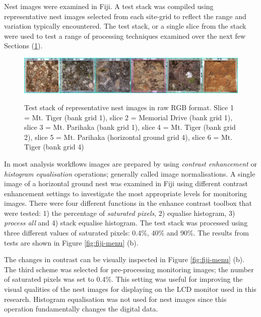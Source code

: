 Nest images were examined in Fiji. A test stack was compiled using representative nest images selected from each site-grid to reflect the range and variation typically encountered. The test stack, or a single slice from the stack were used to test a range of processing techniques examined over the next few Sections (\ref{fig:rep-nest-stack}).

\begin{figure}[!htbp]\myfloatalign
\includegraphics[width=1\linewidth]{gfx6/segtest/1rf}\\
\caption[Test stack of representative nest images]{Test stack of representative nest images in raw \ac{RGB} format. Slice 1 = Mt. Tiger (bank grid 1), slice 2 = Memorial Drive (bank grid 1), slice 3 = Mt. Parihaka (bank grid 1), slice 4 = Mt. Tiger (bank grid 2), slice 5 = Mt. Parihaka (horizontal ground grid 4), slice 6 = Mt. Tiger (bank grid 4)} \label{fig:rep-nest-stack}
\end{figure}

In most analysis workflows images are prepared by using \emph{contrast enhancement} or \emph{histogram equalisation} operations; generally called image normalisations. A single image of a horizontal ground nest was examined in \ac{Fiji} using different contrast enhancement settings to investigate the most appropriate levels for monitoring images. There were four different functions in the enhance contrast toolbox that were tested: 1) the percentage of \emph{saturated pixels}, 2) equalise histogram, 3) \emph{process all} and 4) stack equalise histogram. The test stack was processed using three different values of saturated pixels: 0.4\%, 40\% and 90\%. The results from tests are shown in Figure \ref{fig:fiji-menu} (b). 

The changes in contrast can be visually inspected in Figure \ref{fig:fiji-menu} (b). The third scheme was selected for pre-processing monitoring images; the number of saturated pixels was set to 0.4\%. This setting was useful for improving the visual qualities of the nest images for displaying on the \ac{LCD} monitor used in this research. Histogram equalisation was not used for nest images since this operation fundamentally changes the digital data.

